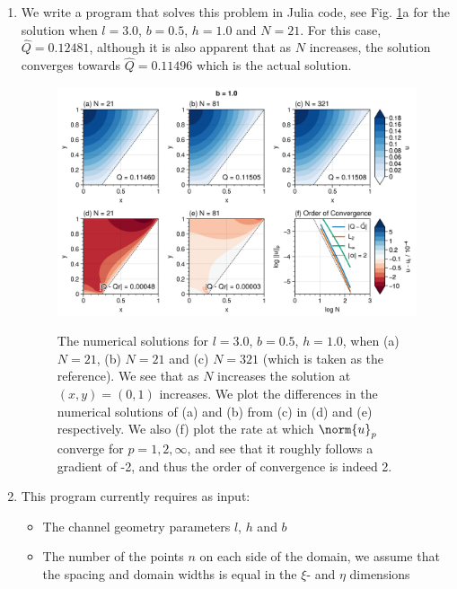 \begin{enumerate}[label=(\roman*),leftmargin=*,itemsep=0mm]
    \item We write a program that solves this problem in Julia code, see Fig. \ref{prj1_qn1f_b0d5}a for the solution when $l=3.0$, $b=0.5$, $h=1.0$ and $N=21$.  For this case, $\hat{Q} = 0.12481$, although it is also apparent that as $N$ increases, the solution converges towards $\hat{Q} = 0.11496$ which is the actual solution.

    \begin{figure}[h!]
    \centering
    \includegraphics[width=\textwidth]{figures/prj1_qn1f_b0d5.png}\\
    \caption{The numerical solutions for $l=3.0$, $b=0.5$, $h=1.0$, when (a) $N=21$, (b) $N=21$ and (c) $N=321$ (which is taken as the reference).  We see that as $N$ increases the solution at $(x,y) = (0,1)$ increases.  We plot the differences in the numerical solutions of (a) and (b) from (c) in (d) and (e) respectively.  We also (f) plot the rate at which $\norm{u}_p$ converge for $p = 1,2,\infty$, and see that it roughly follows a gradient of -2, and thus the order of convergence is indeed 2.}
    \label{prj1_qn1f_b0d5}
    \end{figure}
    
    \item This program currently requires as input:
    \begin{itemize}[nolistsep,noitemsep]
        \item The channel geometry parameters $l$, $h$ and $b$
        \item The number of the points $n$ on each side of the domain, we assume that the spacing and domain widths is equal in the $\xi$- and $\eta$ dimensions
    \end{itemize}
    

\end{enumerate}
